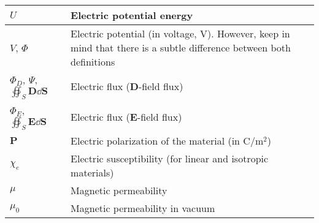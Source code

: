 \begin{xltabular}{\textwidth}{XX}
    \(U\) & Electric potential energy \\ \hline
    \(V\)\cite{wiki:electric-potential}, \(\Phi\)\cite{ramoFieldsWavesCommunication1994} & Electric potential (in voltage, \(\si{\volt}\)). However, keep in mind that there is a subtle difference between both definitions \cite{wiki:electric-potential-vs-voltage}  \\ \hline
	\(\Phi_D\)\cite{wiki:D-field-flux}, \(\varPsi\)\cite{ramoFieldsWavesCommunication1994}, \(\oiint_S \mathbf{D} \dd{\mathbf{S}}\)     & Electric flux (\(\mathbf{D}\)-field flux)                                                                                                                       \\ \hline
	\(\Phi_E\)\cite{wiki:electric-flux}, \(\oiint_S \mathbf{E} \dd{\mathbf{S}}\)              & Electric flux (\(\mathbf{E}\)-field flux)                                                                                                                      \\ \hline
	\(\mathbf{P}\)                                               & Electric polarization of the material (in \(\si{\coulomb\per\meter\squared}\))                                                                                                           \\ \hline
	\(\chi_e\)                                                   & Electric susceptibility (for linear and isotropic materials)                                                                                                                             \\ \hline
	\(\mu\)                                                      & Magnetic permeability                                                                                                                                                                    \\ \hline
	\(\mu_0\)                                                    & Magnetic permeability in vacuum                                                                                                                                                          \\
\end{xltabular}

